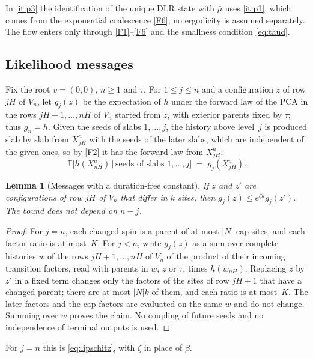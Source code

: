 \documentclass[11pt]{article}
\theoremstyle{plain}
\newtheorem{lemma}[theorem]{Lemma}
\theoremstyle{definition}
\theoremstyle{remark}
\newcommand{\E}{\mathbb{E}}
\newcommand{\ba}{\bar{\mu}}
\begin{document}
In \ref{it:p3} the identification of the unique DLR state with $\ba$ uses \ref{it:p1}, which comes from the exponential coalescence \ref{F6}; no ergodicity is assumed separately. The flow enters only through \ref{F1}--\ref{F6} and the smallness condition \eqref{eq:taud}.

\subsection{Likelihood messages}

Fix the root $v=(0,0)$, $n\ge1$ and $\tau$. For $1\le j\le n$ and a configuration $z$ of row $jH$ of $V_n$, let $g_j(z)$ be the expectation of $h$ under the forward law of the PCA in the rows $jH+1,\dots,nH$ of $V_n$ started from $z$, with exterior parents fixed by $\tau$; thus $g_n=h$. Given the seeds of slabs $1,\dots,j$, the history above level~$j$ is produced slab by slab from $X^a_{jH}$ with the seeds of the later slabs, which are independent of the given ones, so by \ref{F2} it has the forward law from $X^a_{jH}$:
\begin{equation}
\E\bigl[h(X^a_{nH})\,\big|\,\text{seeds of slabs }1,\dots,j\bigr]\;=\;g_j(X^a_{jH}).
\label{eq:message}
\end{equation}

\begin{lemma}[Messages with a duration-free constant]
\label{lem:message}
If $z$ and $z'$ are configurations of row $jH$ of $V_n$ that differ in $k$ sites, then $g_j(z)\le e^{\zeta k}g_j(z')$. The bound does not depend on $n-j$.
\end{lemma}

\begin{proof}
For $j=n$, each changed spin is a parent of at most $|N|$ cap sites, and each factor ratio is at most~$K$. For $j<n$, write $g_j(z)$ as a sum over complete histories $w$ of the rows $jH+1,\dots,nH$ of $V_n$ of the product of their incoming transition factors, read with parents in $w$, $z$ or $\tau$, times $h(w_{nH})$. Replacing $z$ by $z'$ in a fixed term changes only the factors of the sites of row $jH+1$ that have a changed parent; there are at most $|N|k$ of them, and each ratio is at most~$K$. The later factors and the cap factors are evaluated on the same $w$ and do not change. Summing over $w$ proves the claim. No coupling of future seeds and no independence of terminal outputs is used.
\end{proof}

For $j=n$ this is \eqref{eq:lipschitz}, with $\zeta$ in place of $\beta$.
\end{document}
